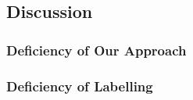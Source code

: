 \subsection{Discussion}

\subsubsection{Deficiency of Our Approach}

\subsubsection{Deficiency of Labelling}